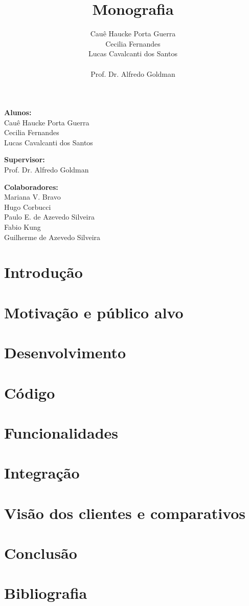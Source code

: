 \documentclass[titlepage,a4paper]{article}
\title{Monografia}
\author{Cauê Haucke Porta Guerra\\Cecilia Fernandes\\Lucas Cavalcanti dos Santos\\ \\Prof. Dr. Alfredo Goldman}
\begin{document}
\maketitle

\begin{description} 
\item{\textbf{Alunos:}\\Cauê Haucke Porta Guerra\\Cecilia Fernandes\\Lucas Cavalcanti dos Santos}
\item{\textbf{Supervisor:}\\Prof. Dr. Alfredo Goldman}
\item{\textbf{Colaboradores:}\\Mariana V. Bravo\\Hugo Corbucci\\Paulo E. de Azevedo Silveira\\Fabio Kung\\Guilherme de Azevedo Silveira}
\end{description}

\section{Introdução}

\section{Motivação e público alvo}

\section{Desenvolvimento}

\section{Código}

\section{Funcionalidades}

\section{Integração}

\section{Visão dos clientes e comparativos}

\section{Conclusão}

\section{Bibliografia}
\end{document}
